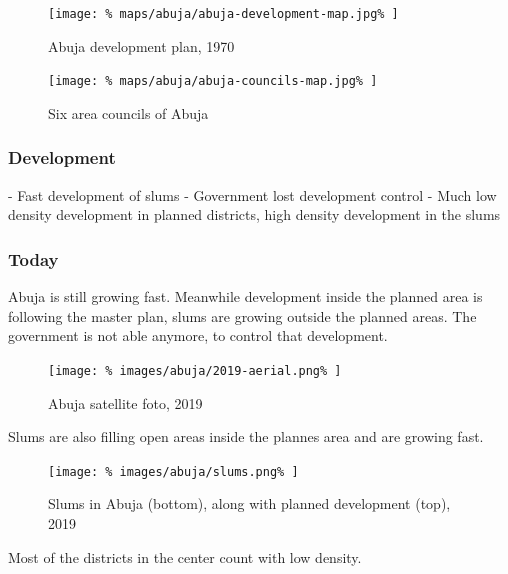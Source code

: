 \documentclass[twocolumn]{article}
\begin{document}
			
			\begin{figure}[h!]
				\texttt{[image: \%
					maps/abuja/abuja-development-map.jpg\%
				]}
				\caption{Abuja development plan, 1970\cite{NairalandForum:AbujaMap}}
				\label{fig:map:abuja-development-plan}
			\end{figure}
			
			\begin{figure}[h!]
				\texttt{[image: \%
					maps/abuja/abuja-councils-map.jpg\%
				]}
				\caption{Six area councils of Abuja\cite{ResearchGate:SixCouncils}}
				\label{fig:map:abuja-six-area-councils}
			\end{figure}
			
			
			
			\subsubsection{Development}
			
			- Fast development of slums
			- Government lost development control
			- Much low density development in planned districts, high density development in the slums
			
			\subsubsection{Today}
			
			Abuja is still growing fast. Meanwhile development inside the planned area is following the master plan, slums are growing outside the planned areas. The government is not able anymore, to control that development.
			
			\begin{figure}[h!]
				\texttt{[image: \%
					images/abuja/2019-aerial.png\%
				]}
				\caption{Abuja satellite foto, 2019\cite{Satellites.pro:Abuja}}
				\label{fig:images:abuja-aerial-2019}
			\end{figure}
			
			Slums are also filling open areas inside the plannes area and are growing fast.
			
			\begin{figure}[h!]
				\texttt{[image: \%
					images/abuja/slums.png\%
				]}
				\caption{Slums in Abuja (bottom), along with planned development (top), 2019\cite{Satellites.pro:Abuja}}
				\label{fig:images:abuja-slums}
			\end{figure}
			
			Most of the districts in the center count with low density.
			
\end{document}
